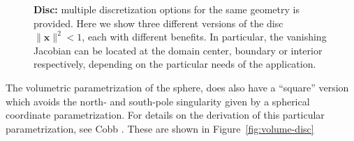 \documentclass[preprint,12pt, a4paper]{elsarticle}
\begin{document}
\begin{figure}
  \begin{center}
    \hspace{.02\linewidth}
    \hspace{.02\linewidth}
    \caption{\textbf{Disc:} multiple discretization options for the same geometry is provided. Here we show three different versions of the disc $\|\mathbf{x}\|^2<1$, each with different benefits. In particular, the vanishing Jacobian can be located at the domain center, boundary or interior respectively, depending on the particular needs of the application.}
    \label{fig:surface-disc}
  \end{center}
\end{figure}

The volumetric parametrization of the sphere, does also have a ``square'' version which avoids the north- and south-pole singularity given by a spherical coordinate parametrization.
For details on the derivation of this particular parametrization, see Cobb \cite{cobb1988tts}.
These are shown in Figure~\ref{fig:volume-disc}
\end{document}
